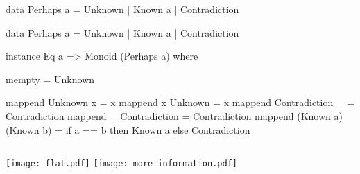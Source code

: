 \begin{frame}[fragile]
\begin{haskellcode}
data Perhaps a = Unknown | Known a | Contradiction
\end{haskellcode}
\end{frame}

\begin{frame}[fragile]

\begin{haskellcode}
data Perhaps a = Unknown | Known a | Contradiction
\end{haskellcode}

\nl

\begin{haskellcode}
instance Eq a => Monoid (Perhaps a) where

  mempty = Unknown

  mappend Unknown x           = x
  mappend x       Unknown     = x
  mappend Contradiction _     = Contradiction
  mappend _     Contradiction = Contradiction
  mappend (Known a) (Known b) =
    if a == b
      then Known a
      else Contradiction
\end{haskellcode}

\end{frame}





\begin{frame}
\begin{columns}
\texttt{[image: flat.pdf]}
\pause
{}
\texttt{[image: more-information.pdf]}
\end{columns}
\end{frame}

